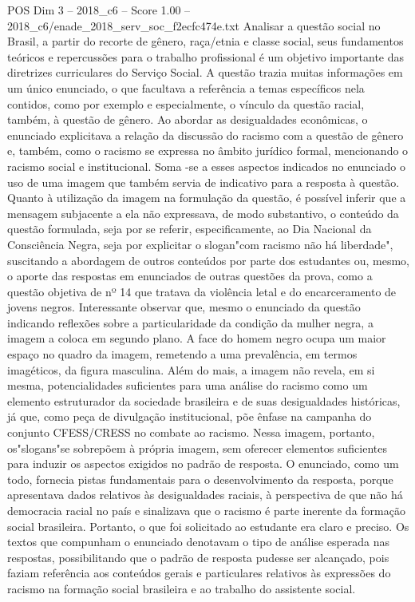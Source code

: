 \begin{textsample}{POS Dim 3 – 2018\_c6 – Score 1.00 – 2018\_c6/enade\_2018\_serv\_soc\_f2ecfc474e.txt}
Analisar a questão social no Brasil, a partir do recorte de gênero, raça/etnia e classe social, seus fundamentos teóricos e repercussões para o trabalho profissional é um objetivo importante das diretrizes curriculares do Serviço Social.
A questão trazia muitas informações em um único enunciado, o que facultava a referência a temas específicos nela contidos, como por exemplo e especialmente, o vínculo da questão racial, também, à questão de gênero.
Ao abordar as desigualdades econômicas, o enunciado explicitava a relação da discussão do racismo com a questão de gênero e, também, como o racismo se expressa no âmbito jurídico formal, mencionando o racismo social e institucional.
Soma -se a esses aspectos indicados no enunciado o uso de uma imagem que também servia de indicativo para a resposta à questão.
Quanto à utilização da imagem na formulação da questão, é possível inferir que a mensagem subjacente a ela não expressava, de modo substantivo, o conteúdo da questão formulada, seja por se referir, especificamente, ao Dia Nacional da Consciência Negra, seja por explicitar o slogan"com racismo não há liberdade", suscitando a abordagem de outros conteúdos por parte dos estudantes ou, mesmo, o aporte das respostas em enunciados de outras questões da prova, como a questão objetiva de nº 14 que tratava da violência letal e do encarceramento de jovens negros.
Interessante observar que, mesmo o enunciado da questão indicando reflexões sobre a particularidade da condição da mulher negra, a imagem a coloca em segundo plano.
A face do homem negro ocupa um maior espaço no quadro da imagem, remetendo a uma prevalência, em termos imagéticos, da figura masculina.
Além do mais, a imagem não revela, em si mesma, potencialidades suficientes para uma análise do racismo como um elemento estruturador da sociedade brasileira e de suas desigualdades históricas, já que, como peça de divulgação institucional, põe ênfase na campanha do conjunto CFESS/CRESS no combate ao racismo.
Nessa imagem, portanto, os"slogans"se sobrepõem à própria imagem, sem oferecer elementos suficientes para induzir os aspectos exigidos no padrão de resposta.
O enunciado, como um todo, fornecia pistas fundamentais para o desenvolvimento da resposta, porque apresentava dados relativos às desigualdades raciais, à perspectiva de que não há democracia racial no país e sinalizava que o racismo é parte inerente da formação social brasileira.
Portanto, o que foi solicitado ao estudante era claro e preciso.
Os textos que compunham o enunciado denotavam o tipo de análise esperada nas respostas, possibilitando que o padrão de resposta pudesse ser alcançado, pois faziam referência aos conteúdos gerais e particulares relativos às expressões do racismo na formação social brasileira e ao trabalho do assistente social.

\end{textsample}
